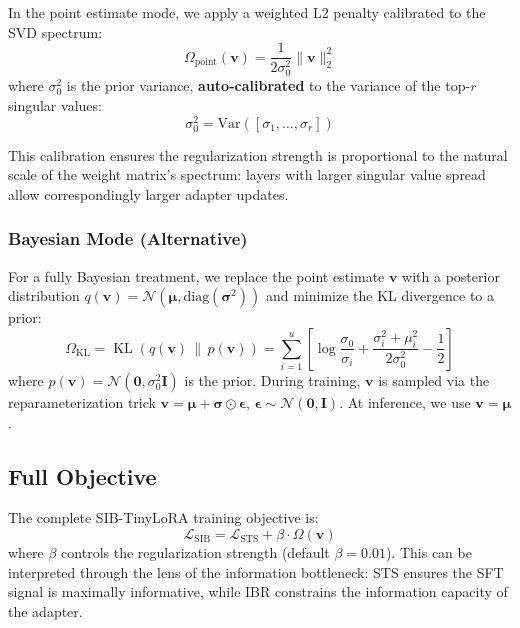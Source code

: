 \documentclass{article}
\DeclareMathOperator{\KL}{KL}
\newcommand{\bv}{\mathbf{v}}
\begin{document}
In the point estimate mode, we apply a weighted L2 penalty calibrated to the SVD spectrum:
\begin{equation}
  \Omega_{\text{point}}(\bv) = \frac{1}{2\sigma_0^2} \|\bv\|_2^2
  \label{eq:ibr_point}
\end{equation}
where $\sigma_0^2$ is the prior variance, \textbf{auto-calibrated} to the variance of the top-$r$ singular values:
\begin{equation}
  \sigma_0^2 = \text{Var}([\sigma_1, \ldots, \sigma_r])
  \label{eq:prior_var}
\end{equation}

This calibration ensures the regularization strength is proportional to the natural scale of the weight matrix's spectrum: layers with larger singular value spread allow correspondingly larger adapter updates.

\subsubsection{Bayesian Mode (Alternative)}

For a fully Bayesian treatment, we replace the point estimate $\bv$ with a posterior distribution $q(\bv) = \mathcal{N}(\boldsymbol{\mu}, \text{diag}(\boldsymbol{\sigma}^2))$ and minimize the KL divergence to a prior:
\begin{equation}
  \Omega_{\text{KL}} = \KL\!\left(q(\bv) \,\|\, p(\bv)\right) = \sum_{i=1}^{u} \left[\log \frac{\sigma_0}{\sigma_i} + \frac{\sigma_i^2 + \mu_i^2}{2\sigma_0^2} - \frac{1}{2}\right]
  \label{eq:ibr_kl}
\end{equation}
where $p(\bv) = \mathcal{N}(\mathbf{0}, \sigma_0^2 \mathbf{I})$ is the prior. During training, $\bv$ is sampled via the reparameterization trick $\bv = \boldsymbol{\mu} + \boldsymbol{\sigma} \odot \boldsymbol{\epsilon}$, $\boldsymbol{\epsilon} \sim \mathcal{N}(\mathbf{0}, \mathbf{I})$. At inference, we use $\bv = \boldsymbol{\mu}$.

\subsection{Full Objective}

The complete SIB-TinyLoRA training objective is:
\begin{equation}
  \boxed{\mathcal{L}_{\text{SIB}} = \mathcal{L}_{\text{STS}} + \beta \cdot \Omega(\bv)}
  \label{eq:full_loss}
\end{equation}
where $\beta$ controls the regularization strength (default $\beta = 0.01$). This can be interpreted through the lens of the information bottleneck: STS ensures the SFT signal is maximally informative, while IBR constrains the information capacity of the adapter.
\end{document}
